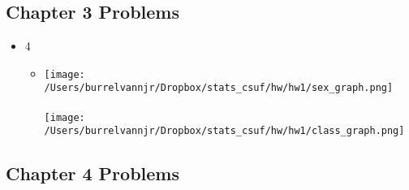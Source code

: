 \documentclass{article}
\begin{document}
\subsection*{Chapter 3 Problems}
\begin{itemize}
\item 4
	\begin{itemize}
	\item \texttt{[image: /Users/burrelvannjr/Dropbox/stats\_csuf/hw/hw1/sex\_graph.png]} \\ \\ \texttt{[image: /Users/burrelvannjr/Dropbox/stats\_csuf/hw/hw1/class\_graph.png]}
	\end{itemize}
\end{itemize}

\subsection*{Chapter 4 Problems}
\end{document}
